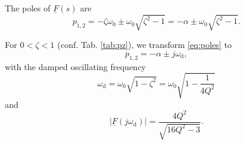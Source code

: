 \documentclass{article}[11pt]
\begin{document}
\medskip

The poles of $\underline{F}(s)$ are
\begin{equation}\label{eq:poles}
p_{1,2} = - \zeta \omega_0 \pm \omega_0 \sqrt{\zeta^2-1} = - \alpha \pm \omega_0 \sqrt{\zeta^2-1}.
\end{equation}

\medskip

For $0<\zeta < 1$ (conf. Tab. \ref{tab:pz}), we transform \eqref{eq:poles} to
\begin{equation}\label{eq:poles-underdamped}
p_{1,2} = - \alpha \pm j \omega_{\mathrm{d}},
\end{equation}
with the damped oscillating frequency 
\begin{equation}\label{eq:poles}
\omega_{\mathrm{d}} = \omega_0 \sqrt{1-\zeta^2} = \omega_0 \sqrt{1-\frac{1}{4 Q^2}}
\end{equation}
and
\begin{equation}
\left|\underline{F}(j\omega_{\mathrm{d}})\right| = \frac{4 Q^2}{\sqrt{16 Q^2 -3}}.
\end{equation}
\end{document}
